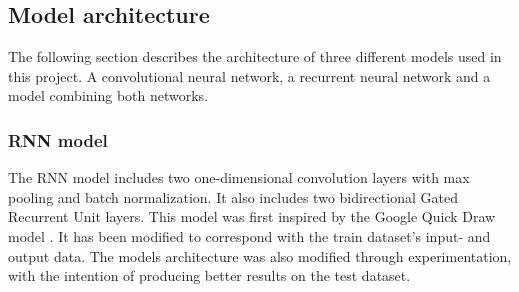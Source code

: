 \subsection{Model architecture} %

The following section describes the architecture of three different models used in this project. A convolutional neural network, a recurrent neural network and a model combining both networks.

\subsubsection{RNN model}

The RNN model includes two one-dimensional convolution layers with max pooling and batch normalization. It also includes two bidirectional Gated Recurrent Unit layers. This model was first inspired by the Google Quick Draw model \cite{_recurrent_2017}. It has been modified to correspond with the train dataset's input- and output data. The models architecture was also modified through experimentation, with the intention of producing better results on the test dataset.
